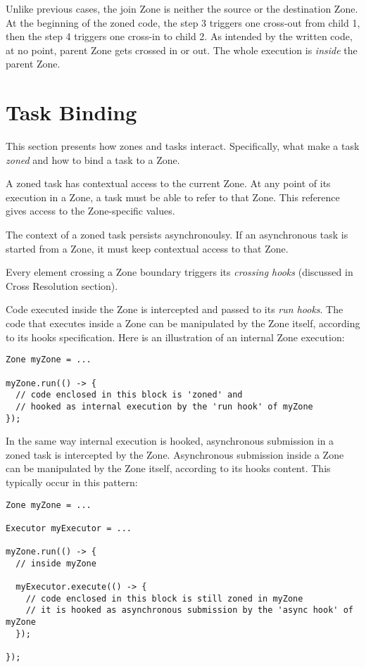 Unlike previous cases, the join Zone is neither the source or the destination Zone. At the beginning of the zoned code, the step 3 triggers one cross-out from child 1, then the step 4 triggers one cross-in to child 2. As intended by the written code, at no point, parent Zone gets crossed in or out. The whole execution is \emph{inside} the parent Zone.

\section{Task Binding}

This section presents how zones and tasks interact. Specifically, what make a task \emph{zoned} and how to bind a task to a Zone.

A zoned task has contextual access to the current Zone. At any point of its execution in a Zone, a task must be able to refer to that Zone. This reference gives
access to the Zone-specific values.

The context of a zoned task persists asynchronoulsy. If an asynchronous task is started from a Zone, it must keep contextual access to that Zone.

Every element crossing a Zone boundary triggers its \emph{crossing hooks} (discussed in Cross Resolution section).

Code executed inside the Zone is intercepted and passed to its \emph{run hooks}. The code that executes inside a Zone can be manipulated by the Zone itself, according to its hooks specification. Here is an illustration of an internal Zone execution:

\begin{lstlisting}
Zone myZone = ...

myZone.run(() -> {
  // code enclosed in this block is 'zoned' and
  // hooked as internal execution by the 'run hook' of myZone
});
\end{lstlisting}

In the same way internal execution is hooked, asynchronous submission in a zoned task is intercepted by the Zone.
Asynchronous submission inside a Zone can be manipulated by the Zone itself, according to its hooks content. This typically occur in this pattern:

\begin{lstlisting}
Zone myZone = ...

Executor myExecutor = ...

myZone.run(() -> {
  // inside myZone

  myExecutor.execute(() -> {
    // code enclosed in this block is still zoned in myZone
    // it is hooked as asynchronous submission by the 'async hook' of myZone
  });
  
});
\end{lstlisting}

